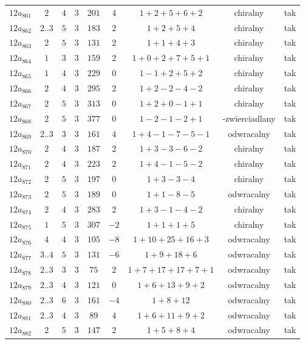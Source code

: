 \begin{longtable}{ccccccccc}
$12a_{861}$ & $2$ & $4$ & $3$ & $201$ & $4$ & $1+2+5+6+2$ & chiralny & tak \\
$12a_{862}$ & $2..3$ & $5$ & $3$ & $183$ & $2$ & $1+2+5+4$ & chiralny & tak \\
$12a_{863}$ & $2$ & $5$ & $3$ & $131$ & $2$ & $1+1+4+3$ & chiralny & tak \\
$12a_{864}$ & $1$ & $3$ & $3$ & $159$ & $2$ & $1+0+2+7+5+1$ & chiralny & tak \\
$12a_{865}$ & $1$ & $4$ & $3$ & $229$ & $0$ & $1-1+2+5+2$ & chiralny & tak \\
$12a_{866}$ & $2$ & $4$ & $3$ & $295$ & $2$ & $1+2-2-4-2$ & chiralny & tak \\
$12a_{867}$ & $2$ & $5$ & $3$ & $313$ & $0$ & $1+2+0-1+1$ & chiralny & tak \\
$12a_{868}$ & $2$ & $5$ & $3$ & $377$ & $0$ & $1-2-1-2+1$ & -zwierciadlany & tak \\
$12a_{869}$ & $2..3$ & $3$ & $3$ & $161$ & $4$ & $1+4-1-7-5-1$ & odwracalny & tak \\
$12a_{870}$ & $2$ & $4$ & $3$ & $187$ & $2$ & $1+3-3-6-2$ & chiralny & tak \\
$12a_{871}$ & $2$ & $4$ & $3$ & $223$ & $2$ & $1+4-1-5-2$ & chiralny & tak \\
$12a_{872}$ & $2$ & $5$ & $3$ & $197$ & $0$ & $1+3-3-4$ & chiralny & tak \\
$12a_{873}$ & $2$ & $5$ & $3$ & $189$ & $0$ & $1+1-8-5$ & odwracalny & tak \\
$12a_{874}$ & $2$ & $4$ & $3$ & $283$ & $2$ & $1+3-1-4-2$ & chiralny & tak \\
$12a_{875}$ & $1$ & $5$ & $3$ & $307$ & $-2$ & $1+1+1+5$ & chiralny & tak \\
$12a_{876}$ & $4$ & $4$ & $3$ & $105$ & $-8$ & $1+10+25+16+3$ & odwracalny & tak \\
$12a_{877}$ & $3..4$ & $5$ & $3$ & $131$ & $-6$ & $1+9+18+6$ & odwracalny & tak \\
$12a_{878}$ & $2..3$ & $3$ & $3$ & $75$ & $2$ & $1+7+17+17+7+1$ & odwracalny & tak \\
$12a_{879}$ & $2..3$ & $4$ & $3$ & $121$ & $0$ & $1+6+13+9+2$ & odwracalny & tak \\
$12a_{880}$ & $2..3$ & $6$ & $3$ & $161$ & $-4$ & $1+8+12$ & odwracalny & tak \\
$12a_{881}$ & $2..3$ & $4$ & $3$ & $89$ & $4$ & $1+6+11+9+2$ & odwracalny & tak \\
$12a_{882}$ & $2$ & $5$ & $3$ & $147$ & $2$ & $1+5+8+4$ & odwracalny & tak \\

\end{longtable}
